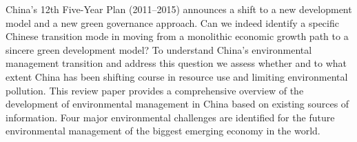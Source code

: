 China's 12th Five-Year Plan (2011–2015) announces a shift to a new development model and a new green governance approach. Can we indeed identify a specific Chinese transition mode in moving from a monolithic economic growth path to a sincere green development model? To understand China's environmental management transition and address this question we assess whether and to what extent China has been shifting course in resource use and limiting environmental pollution. This review paper provides a comprehensive overview of the development of environmental management in China based on existing sources of information. Four major environmental challenges are identified for the future environmental management of the biggest emerging economy in the world.
